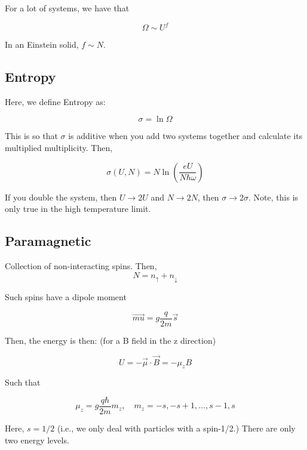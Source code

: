 \documentclass{article}
\newtheorem{one minute paper}[theorem]{One Minute Paper}
\begin{document}
For a lot of systems, we have that 

\begin{equation}
    \Omega \sim U^f
\end{equation}

In an Einstein solid, $f \sim N$. 

\subsection*{Entropy}

Here, we define Entropy as:

\begin{equation}
    \sigma = \ln \Omega
\end{equation}

This is so that $\sigma$ is additive when you add two systems together and calculate its multiplied multiplicity. Then, 

\begin{equation}
    \sigma(U,N) = N \ln \left( \frac{eU}{N \hbar \omega} \right)
\end{equation}

If you double the system, then $U \rightarrow 2U$ and $N \rightarrow 2N$, then $\sigma \rightarrow 2\sigma$. Note, this is only true in the high temperature limit. 

\subsection*{Paramagnetic}

Collection of non-interacting spins. Then, $$N = n_{\uparrow} + n_{\downarrow}$$

Such spins have a dipole moment

\begin{equation}
    \vec{mu} = g \frac{q}{2m}\vec{s}
\end{equation}

Then, the energy is then: (for a B field in the z direction)

\begin{equation}
    U = -\vec{\mu} \cdot \vec{B} = -\mu_z B
\end{equation}

Such that 

\begin{equation}
    \mu_z = g \frac{q\hbar}{2m}m_z, \quad m_z = -s, -s + 1, \dots, s-1, s
\end{equation}

Here, $s = 1/2$ (i.e., we only deal with particles with a spin-1/2.) There are only two energy levels. 
\end{document}

